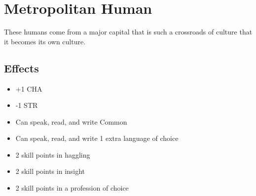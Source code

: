 \section{Metropolitan Human}\label{culture:metropolitan-human}
These humans come from a major capital that is such a crossroads of culture
that it becomes its own culture.

\subsection{Effects}
\begin{itemize}
    \item +1 CHA
    \item -1 STR
    \item Can speak, read, and write Common
    \item Can speak, read, and write 1 extra language of choice
    \item 2 skill points in haggling
    \item 2 skill points in insight
    \item 2 skill points in a profession of choice
\end{itemize}
